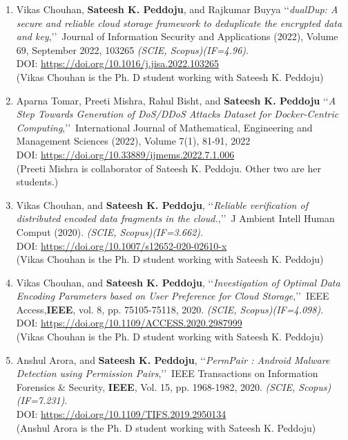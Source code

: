 \begin{enumerate}%
	\item
	Vikas Chouhan, \textbf{Sateesh K. Peddoju}, and Rajkumar Buyya \lq\lq \textit{dualDup: A secure and reliable cloud storage framework to deduplicate the encrypted data and key},\rq\rq\, Journal of Information Security and Applications (2022), Volume 69, September 2022, 103265 \emph{(SCIE, Scopus)(IF=4.96)}. \\DOI: \url{https://doi.org/10.1016/j.jisa.2022.103265}  \\(Vikas Chouhan is the Ph. D student working with Sateesh K. Peddoju)

 	\item
  Aparna Tomar, Preeti Mishra, Rahul Bisht, and \textbf{Sateesh K. Peddoju} \lq\lq \textit{A Step Towards Generation of DoS/DDoS Attacks Dataset for Docker-Centric Computing},\rq\rq\, International Journal of Mathematical, Engineering and Management Sciences (2022), Volume 7(1), 81-91, 2022 \\DOI: \url{https://doi.org/10.33889/ijmems.2022.7.1.006}  \\(Preeti Mishra is collaborator of Sateesh K. Peddoju. Other two are her students.)
 
 \item
	Vikas Chouhan, and \textbf{Sateesh K. Peddoju}, \lq\lq \textit{Reliable verification of distributed encoded data fragments in the cloud.},\rq\rq\, J Ambient Intell Human Comput (2020). \emph{(SCIE, Scopus)(IF=3.662)}. \\DOI: \url{https://doi.org/10.1007/s12652-020-02610-x}  \\(Vikas Chouhan is the Ph. D student working with Sateesh K. Peddoju)
	
	\item
	Vikas Chouhan, and \textbf{Sateesh K. Peddoju}, \lq\lq \textit{Investigation of Optimal Data Encoding Parameters based on User Preference for Cloud Storage},\rq\rq\, IEEE Access,\textbf{IEEE}, vol. 8, pp. 75105-75118, 2020. \emph{(SCIE, Scopus)(IF=4.098)}. \\DOI: \url{https://doi.org/10.1109/ACCESS.2020.2987999} \\(Vikas Chouhan is the Ph. D student working with Sateesh K. Peddoju)
	
	\item
	Anshul Arora, and \textbf{Sateesh K. Peddoju}, \lq\lq \textit{PermPair :  Android Malware Detection using Permission Pairs},\rq\rq\, IEEE Transactions on Information Forensics \& Security, \textbf{IEEE}, Vol. 15, pp. 1968-1982, 2020. \emph{(SCIE, Scopus)(IF=7.231)}. \\DOI: \url{https://doi.org/10.1109/TIFS.2019.2950134}  \\(Anshul Arora is the Ph. D student working with Sateesh K. Peddoju)


\end{enumerate}
